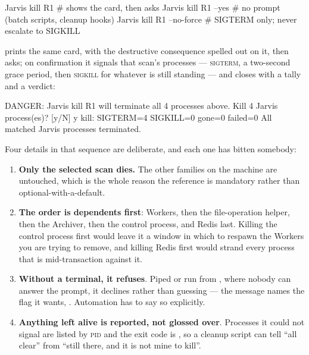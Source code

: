 \begin{terminal}
\begin{jcmd}
Jarvis kill R1              # shows the card, then asks
Jarvis kill R1 --yes        # no prompt (batch scripts, cleanup hooks)
Jarvis kill R1 --no-force   # SIGTERM only; never escalate to SIGKILL
\end{jcmd}
\end{terminal}

 prints the same card, with the destructive consequence spelled out on it, then
asks; on confirmation it signals that scan's processes --- \textsc{sigterm}, a two-second
grace period, then \textsc{sigkill} for whatever is still standing --- and closes with a
tally and a verdict:

\begin{terminal}
\begin{jout}
DANGER: Jarvis kill R1 will terminate all 4 processes above.
Kill 4 Jarvis process(es)? [y/N] y
kill: SIGTERM=4 SIGKILL=0 gone=0 failed=0
All matched Jarvis processes terminated.
\end{jout}
\end{terminal}

Four details in that sequence are deliberate, and each one has bitten somebody:

\begin{enumerate}
  \item \textbf{Only the selected scan dies.} The other families on the machine are
        untouched, which is the whole reason the reference is mandatory rather than
        optional-with-a-default.
  \item \textbf{The order is dependents first}: Workers, then the file-operation
        helper, then the Archiver, then the control process, and Redis last. Killing the
        control process first would leave it a window in which to respawn the Workers
        you are trying to remove, and killing Redis first would strand every process
        that is mid-transaction against it.
  \item \textbf{Without a terminal, it refuses}. Piped or run from , where
        nobody can answer the prompt, it declines rather than guessing --- the message
        names the flag it wants, . Automation has
        to say so explicitly.
  \item \textbf{Anything left alive is reported, not glossed over}. Processes it could
        not signal are listed by \textsc{pid} and the exit code is , so a
        cleanup script can tell ``all clear'' from ``still there, and it is not mine to
        kill''.
\end{enumerate}

